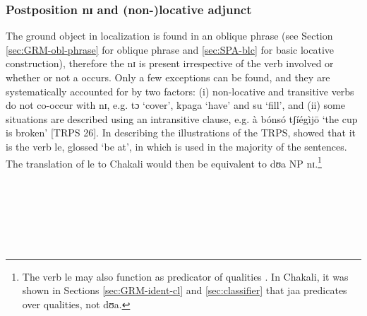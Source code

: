 \begin{exe}
\begin{exe}
\begin{exe}
\subsubsection{Postposition {\sls nɪ} and (non-)locative adjunct}
\label{sec:SPA-postp}

The ground object in localization is found in an oblique phrase  (see Section \ref{sec:GRM-obl-phrase} for oblique phrase and \ref{sec:SPA-blc} for basic locative construction), therefore the   {\sls nɪ} is present irrespective of the  verb involved or whether or not a  occurs. Only a  few exceptions can be found,   and they are systematically accounted for by two factors: (i) non-locative and transitive verbs  do not co-occur with {\sls nɪ}, e.g. {\sls tɔ} `cover', {\sls kpaga} `have' and {\sls su} `fill',  and (ii) some situations are described using an intransitive clause, e.g.   {\sls à bónsó tʃíégìjō} `the cup is broken'  [TRPS 26].  In describing the illustrations of the TRPS, \citet[370]{Amek06} showed that it is the  verb {\sls le}, glossed  `be at',  in  which is used in the majority of the sentences.   The translation of   {\sls le} to Chakali would then be equivalent to {\sls dʊa {\rm NP} nɪ}.\footnote{The  verb {\sls le} may also function as predicator of qualities \citep[373]{Amek06}. In Chakali,  it was shown  in Sections \ref{sec:GRM-ident-cl} and \ref{sec:classifier} that   {\sls jaa} predicates over qualities,  not  {\sls dʊa}.}

\newpage 

\ea\label{ex:postp-corres}
 \\
 
 \\
 
  \\
 
  \\
  
   \\
 

\end{exe}
\end{exe}
\end{exe}
